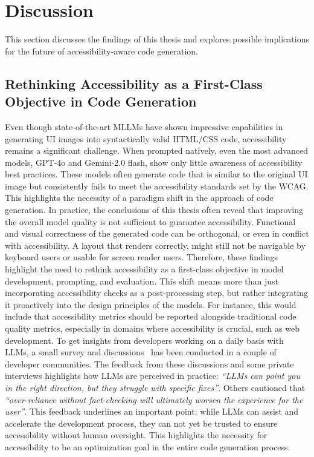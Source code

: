 \chapter{Discussion}\label{chapter:discussion}
This section discusses the findings of this thesis 
and explores possible implications for the future 
of accessibility-aware code generation.

\section{Rethinking Accessibility as a First-Class Objective in Code Generation}
Even though state-of-the-art MLLMs have shown impressive 
capabilities in generating UI images into syntactically 
valid HTML/CSS code, accessibility remains a significant 
challenge. When prompted natively, even the most advanced models, 
GPT-4o and Gemini-2.0 flash, show only little awareness 
of accessibility best practices.
These models often generate code that is similar to the 
original UI image but consistently fails to meet 
the accessibility standards set by the WCAG.
This highlights the necessity of a paradigm 
shift in the approach of code generation. 
In practice, the conclusions of this thesis 
often reveal that improving 
the overall model quality is not sufficient to guarantee
accessibility. 
Functional and visual correctness of the generated code 
can be orthogonal, or even in conflict with accessibility. 
A layout that renders correctly, might still not be navigable 
by keyboard users or usable for screen reader users.\newline 
Therefore, these findings highlight the need to rethink 
accessibility as a first-class objective in model
development, prompting, and evaluation. This shift 
means more than just incorporating accessibility 
checks as a post-processing step, but rather
integrating it proactively into the design principles 
of the models. For instance, this would include that 
accessibility metrics should be reported alongside traditional 
code quality metrics, especially in domains 
where accessibility is crucial, such as web development.\newline 
To get insights from developers working on 
a daily basis with LLMs, a small survey and discussions~\cite{feng2025ux, lutz2025mot} 
has been conducted in a couple of developer communities.
The feedback from these discussions and some private interviews 
highlights how 
LLMs are perceived in practice: \textit{``LLMs can point 
you in the right direction, but they struggle with specific fixes''}.
Others cautioned that \textit{``over-reliance without fact-checking will 
ultimately worsen the experience for the user''}. This 
feedback underlines an important point: while LLMs can 
assist and accelerate the development process, they can not yet
be trusted to ensure accessibility without human oversight. 
This highlights the necessity for accessibility to be 
an optimization goal in the entire code generation process.



